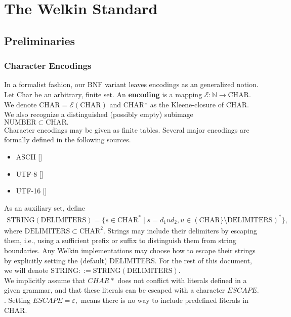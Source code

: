 

\chapter{The Welkin Standard}

\section{Preliminaries}

\newcommand*{\chars}{\mathrm{CHAR}}
\newcommand*{\bytes}{\mathrm{BYTES}}
\newcommand*{\numbers}{\mathrm{NUMBER}}
\newcommand*{\strings}{\mathrm{STRING}}
\newcommand*{\term}{\mathrm{term}}
\newcommand*{\terms}{\mathrm{terms}}
\newcommand*{\delimiters}{\mathrm{DELIMITERS}}
\newcommand*{\encoding}{\mathcal{E}}

\subsection{Character Encodings}
In a formalist fashion, our BNF variant leaves encodings as an generalized notion. Let Char be an arbitrary, finite set.
An \textbf{encoding} is a mapping $\encoding : \mathbb{N} \to \chars.$
We denote $\chars = \encoding(\chars)$ and CHAR* as the Kleene-closure of CHAR. We also recognize a distinguished (possibly empty) subimage $\numbers \subset \chars.$ %
\\ Character encodings may be given as finite tables. Several major encodings are formally defined in the following sources.
\begin{itemize}
	\item ASCII []
	\item UTF-8 []
	\item UTF-16 []
\end{itemize}
As an auxiliary set, define
\begin{align*}
	\strings(\delimiters) = \{s \in \chars^{*}\;|\; s = d_{1} u d_{2}, u \in (\chars\} \setminus \delimiters)^{*}\},\end{align*}
where $\delimiters \subset \chars^{2}.$
Strings may include their delimiters by escaping them, i.e., using a sufficient prefix or suffix to distinguish them from string boundaries. Any Welkin implementations may choose how to escape their strings by explicitly setting the (default) DELIMITERS. For the rest of this document, we will denote $\strings ::= \strings(\delimiters)$.
\\ We implicitly assume that $CHAR*$ does not conflict with literals defined in a given grammar, and that these literals can be escaped with a character $ESCAPE.$. Setting $ESCAPE = \varepsilon,$ means there is no way to include predefined literals in CHAR.

